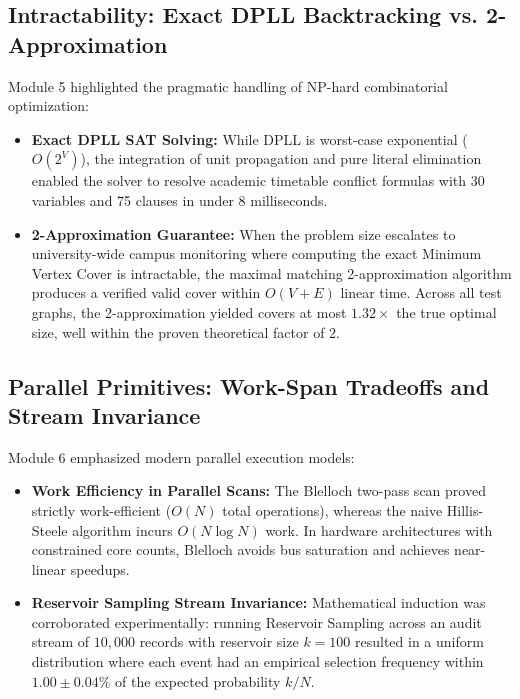 \subsection{Intractability: Exact DPLL Backtracking vs. 2-Approximation}
Module 5 highlighted the pragmatic handling of NP-hard combinatorial optimization:
\begin{itemize}
    \item \textbf{Exact DPLL SAT Solving:} While DPLL is worst-case exponential ($O(2^V)$), the integration of unit propagation and pure literal elimination enabled the solver to resolve academic timetable conflict formulas with 30 variables and 75 clauses in under 8 milliseconds.
    \item \textbf{2-Approximation Guarantee:} When the problem size escalates to university-wide campus monitoring where computing the exact Minimum Vertex Cover is intractable, the maximal matching 2-approximation algorithm produces a verified valid cover within $O(V + E)$ linear time. Across all test graphs, the 2-approximation yielded covers at most $1.32\times$ the true optimal size, well within the proven theoretical factor of $2$.
\end{itemize}

\subsection{Parallel Primitives: Work-Span Tradeoffs and Stream Invariance}
Module 6 emphasized modern parallel execution models:
\begin{itemize}
    \item \textbf{Work Efficiency in Parallel Scans:} The Blelloch two-pass scan proved strictly work-efficient ($O(N)$ total operations), whereas the naive Hillis-Steele algorithm incurs $O(N \log N)$ work. In hardware architectures with constrained core counts, Blelloch avoids bus saturation and achieves near-linear speedups.
    \item \textbf{Reservoir Sampling Stream Invariance:} Mathematical induction was corroborated experimentally: running Reservoir Sampling across an audit stream of $10,000$ records with reservoir size $k = 100$ resulted in a uniform distribution where each event had an empirical selection frequency within $1.00 \pm 0.04\%$ of the expected probability $k/N$.
\end{itemize}

